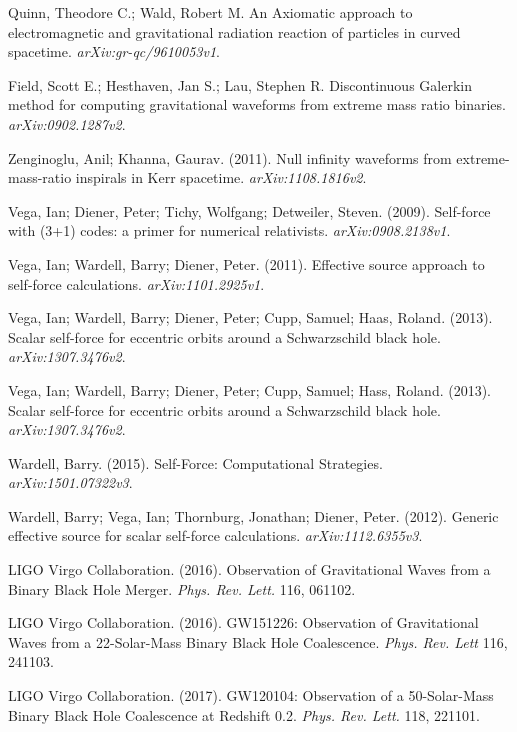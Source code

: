 Quinn, Theodore C.; Wald, Robert M. An Axiomatic approach to electromagnetic and gravitational radiation reaction of particles in curved spacetime. {\em arXiv:gr-qc/9610053v1}.

Field, Scott E.; Hesthaven, Jan S.; Lau, Stephen R. Discontinuous Galerkin method for computing gravitational waveforms from extreme mass ratio binaries. {\em arXiv:0902.1287v2}.

Zenginoglu, Anil; Khanna, Gaurav. (2011). Null infinity waveforms from extreme-mass-ratio inspirals in Kerr spacetime. {\em arXiv:1108.1816v2}.

Vega, Ian; Diener, Peter; Tichy, Wolfgang; Detweiler, Steven. (2009). Self-force with (3+1) codes: a primer for numerical relativists. {\em arXiv:0908.2138v1}.

Vega, Ian; Wardell, Barry; Diener, Peter. (2011). Effective source approach to self-force calculations. {\em arXiv:1101.2925v1}.

Vega, Ian; Wardell, Barry; Diener, Peter; Cupp, Samuel; Haas, Roland. (2013). Scalar self-force for eccentric orbits around a Schwarzschild black hole. {\em arXiv:1307.3476v2}.

Vega, Ian; Wardell, Barry; Diener, Peter; Cupp, Samuel; Hass, Roland. (2013). Scalar self-force for eccentric orbits around a Schwarzschild black hole. {\em arXiv:1307.3476v2}.

Wardell, Barry. (2015). Self-Force: Computational Strategies. {\em arXiv:1501.07322v3}.

Wardell, Barry; Vega, Ian; Thornburg, Jonathan; Diener, Peter. (2012). Generic effective source for scalar self-force calculations. {\em arXiv:1112.6355v3}.



LIGO Virgo Collaboration. (2016). Observation of Gravitational Waves from a Binary Black Hole Merger. {\em Phys. Rev. Lett.} 116, 061102.

LIGO Virgo Collaboration. (2016). GW151226: Observation of Gravitational Waves from a 22-Solar-Mass Binary Black Hole Coalescence. {\em Phys. Rev. Lett} 116, 241103.
  
  LIGO Virgo Collaboration. (2017). GW120104: Observation of a 50-Solar-Mass Binary Black Hole Coalescence at Redshift 0.2. {\em Phys. Rev. Lett.} 118, 221101.

